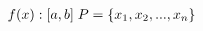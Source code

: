 \documentclass[preview]{standalone}
\begin{document}
\begin{align*}
f(x):[a,b] \hspace{0.1cm} P = \{x_1,x_2,...,x_n\}
\end{align*}
\end{document}
